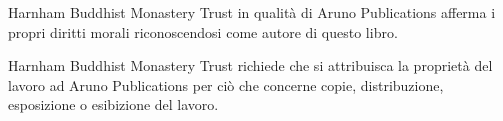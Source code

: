 {Harnham Buddhist Monastery Trust in qualità di Aruno Publications afferma i propri diritti morali riconoscendosi come autore di questo libro.

Harnham Buddhist Monastery Trust richiede che si attribuisca la proprietà del lavoro ad Aruno Publications per ciò che concerne copie, distribuzione, esposizione o esibizione del lavoro.

}
